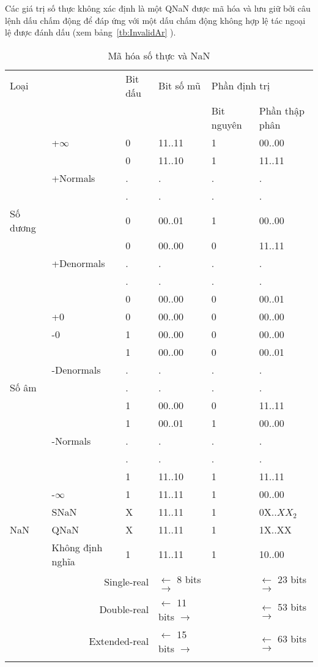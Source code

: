 	Các giá trị số thực không xác định là một QNaN được mã hóa và lưu giữ bởi câu lệnh dấu chấm động để đáp ứng với một dấu chấm động không hợp lệ tác ngoại lệ được đánh dấu (xem bảng~\ref{tb:InvalidAr} ).	
	\newpage
		\begin{longtable}{|l|l|l|l|l|l|}
			\hline
				\multicolumn{2}{|l|}{Loại} & Bit dấu & Bit số mũ & \multicolumn{2}{l|}{Phần định trị} \\
				\cline{5-6}
				\multicolumn{2}{|l|}{} & & & Bit nguyên & Phần thập phân \\
			\hline
				 & +$\mathbb{\infty}$ & 0 & 11..11 & 1 & 00..00 \\
				\cline{2-6}
				  & & 0 & 11..10 & 1 & 11..11 \\
				  & +Normals & . & .& . & . \\
				  & & . & . & . & . \\
				 Số dương & & 0 & 00..01 & 1 & 00..00 \\
				 	\cline{2-6}
				  & & 0 & 00..00 & 0 & 11..11 \\
				  & +Denormals& . & .& . & . \\
				  & & . & . & . & . \\
				  & & 0 & 00..00 & 0 & 00..01 \\
				  \cline{2-6}
				  & +0 & 0& 00..00 & 0 & 00..00 \\
			\hline			
				  & -0 & 1 & 00..00 & 0 & 00..00 \\
				\cline{2-6}
				  & & 1 & 00..00 & 0 & 00..01 \\
				  & -Denormals& . & .& . & . \\
				 Số âm & & . & . & . & . \\
				  & & 1 & 00..00 & 0 & 11..11 \\
				\cline{2-6}
				  & & 1 & 00..01 & 1 & 00..00 \\
				  & -Normals & . & .& . & . \\
				  & & . & . & . & . \\
				  & & 1 & 11..10 & 1 & 11..11 \\
				 \cline{2-6}
				  & -$\mathbb{\infty}$ & 1 & 11..11 & 1 & 00..00 \\
			\hline			
				  & SNaN & X & 11..11 & 1&  0X..$XX_2$ \\
				\cline{2-6}
				 NaN & QNaN & X & 11..11 & 1& 1X..XX\\
				\cline{2-6}
				  & Không định nghĩa &1 & 11..11& 1  &10..00 \\
			\hline
				\multicolumn{3}{r|}{Single-real} & $\leftarrow$ 8 bits $\to $ & & $\leftarrow$ 23 bits $\to $ \\
				\multicolumn{3}{r|}{Double-real} & $\leftarrow$ 11 bits $\to $ & & $\leftarrow$ 53 bits $\to $ \\
				\multicolumn{3}{r|}{Extended-real} & $\leftarrow$ 15 bits $\to $ & & $\leftarrow$ 63 bits $\to $ \\
				\caption{Mã hóa số thực và NaN}
				\label{tb:MaHoaSoThuc}
		\end{longtable}	
	

